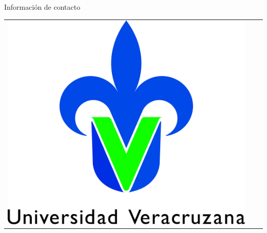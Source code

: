 \documentclass[final]{beamer}
\newlength{\onecolwid}
\begin{document}
\begin{frame}[t]
\begin{columns}[t]
\begin{column}{\onecolwid}
\begin{alertblock}{Información de contacto}
\end{alertblock}

\begin{center}
\begin{tabular}{ccc}
\includegraphics[width=0.4\linewidth]{img/uv_logo} %
\end{tabular}
\end{center}


\end{column} %

\end{columns} %

\end{frame} %
\end{document}
